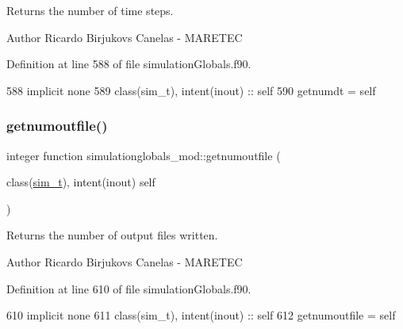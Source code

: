 Returns the number of time steps. 

\begin{DoxyAuthor}{Author}
Ricardo Birjukovs Canelas -\/ M\+A\+R\+E\+T\+EC 
\end{DoxyAuthor}


Definition at line 588 of file simulation\+Globals.\+f90.


\begin{DoxyCode}
588     \textcolor{keywordtype}{implicit none}
589     \textcolor{keywordtype}{class}(sim\_t), \textcolor{keywordtype}{intent(inout)} :: self
590     getnumdt = self%
\end{DoxyCode}
\mbox{\label{namespacesimulationglobals__mod_a2b76dc3e6cbf1256253c54903df8393b}} 
\subsubsection{\texorpdfstring{getnumoutfile()}{getnumoutfile()}}
{\footnotesize\ttfamily integer function simulationglobals\+\_\+mod\+::getnumoutfile (\begin{DoxyParamCaption}\item[{class(\mbox{\hyperlink{structsimulationglobals__mod_1_1sim__t}{sim\+\_\+t}}), intent(inout)}]{self }\end{DoxyParamCaption})\hspace{0.3cm}{\ttfamily [private]}}



Returns the number of output files written. 

\begin{DoxyAuthor}{Author}
Ricardo Birjukovs Canelas -\/ M\+A\+R\+E\+T\+EC 
\end{DoxyAuthor}


Definition at line 610 of file simulation\+Globals.\+f90.


\begin{DoxyCode}
610     \textcolor{keywordtype}{implicit none}
611     \textcolor{keywordtype}{class}(sim\_t), \textcolor{keywordtype}{intent(inout)} :: self
612     getnumoutfile = self%
\end{DoxyCode}
\mbox{\label{namespacesimulationglobals__mod_ac4915156236196940b31ff02d53af295}} 
